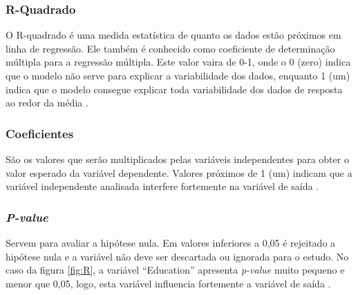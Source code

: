 \subsubsection*{R-Quadrado}

O R-quadrado é uma medida estatística de quanto os dados estão próximos em linha de regressão. Ele também é conhecido como coeficiente de determinação múltipla para a regressão múltipla. Este valor vaira de 0-1, onde o 0 (zero) indica que o modelo não serve para explicar a variabilidade dos dados, enquanto 1 (um) indica que o modelo consegue explicar toda variabilidade dos dados de resposta ao redor da média \cite{5}. 

\subsubsection*{Coeficientes}

São os valores que serão multiplicados pelas variáveis independentes para obter o valor esperado da variável dependente. Valores próximos de 1 (um) indicam que a variável independente analisada interfere fortemente na variável de saída \cite{5}. 

\subsubsection*{\emph{P-value}}

Servem para avaliar a hipótese nula. Em valores inferiores a 0,05 é rejeitado a hipótese nula e a variável não deve ser descartada ou ignorada para o estudo. No caso da figura \ref*{fig:R}, a variável ``Education'' apresenta \emph{p-value} muito pequeno e menor que 0,05, logo, esta variável influencia fortemente a variável de saída \cite{5}.
